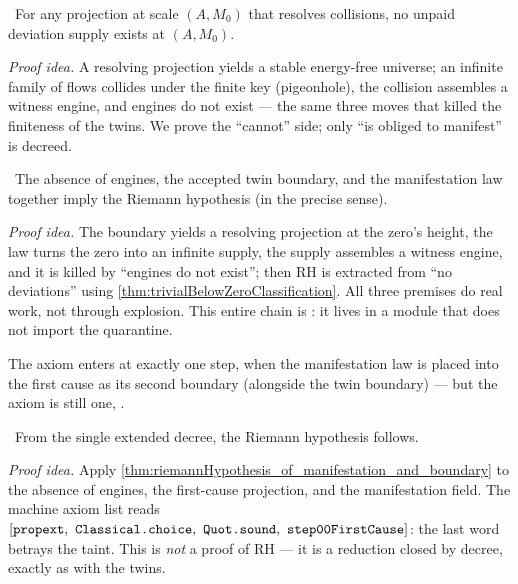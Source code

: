 \begin{theorem}\label{thm:no_deviationFlowSupply_at_resolved_scale}
\green{}\ For any projection at scale $(A,M_0)$ that resolves collisions, no unpaid deviation supply
exists at $(A,M_0)$. 
\end{theorem}

\emph{Proof idea.} A resolving projection yields a stable energy-free universe; an infinite family of
flows collides under the finite key (pigeonhole), the collision assembles a witness engine, and
engines do not exist --- the same three moves that killed the finiteness of the twins. We prove the
``cannot'' side; only ``is obliged to manifest'' is decreed.

\begin{theorem}\label{thm:riemannHypothesis_of_manifestation_and_boundary}
\green{}\ The absence of engines, the accepted twin boundary, and the manifestation law together
imply the Riemann hypothesis (in the precise  sense).
\end{theorem}

\emph{Proof idea.} The boundary yields a resolving projection at the zero's height, the law turns the
zero into an infinite supply, the supply assembles a witness engine, and it is killed by ``engines do
not exist''; then RH is extracted from ``no deviations'' using
\cref{thm:trivialBelowZeroClassification}. All three premises do real work, not through explosion.
This entire chain is \green{}: it lives in a module that does not import the quarantine.

The axiom enters at exactly one step, when the manifestation law is placed into the first cause as
its second boundary (alongside the twin boundary) --- but the axiom is still one, \axiom{}.

\begin{theorem}\label{thm:riemannHypothesis_from_firstCause}
\yellow{}\ From the single extended decree, the Riemann hypothesis follows.
\end{theorem}

\emph{Proof idea.} Apply \cref{thm:riemannHypothesis_of_manifestation_and_boundary} to the absence of
engines, the first-cause projection, and the manifestation field. The machine axiom list reads
$[\code{propext},\ \code{Classical.choice},\ \code{Quot.sound},\ \axiom{}]$: the last word betrays
the taint. This is \emph{not} a proof of RH --- it is a reduction closed by decree, exactly as with
the twins.

